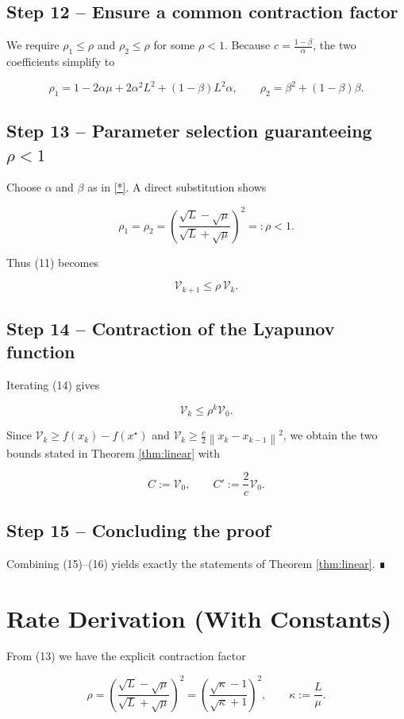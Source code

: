 \documentclass{article}
\newcommand{\norm}[1]{\left\|#1\right\|}
\begin{document}
\subsection*{Step 12 – Ensure a common contraction factor}
We require $\rho_{1}\le\rho$ and $\rho_{2}\le\rho$ for some $\rho<1$.  
Because $c=\frac{1-\beta}{\alpha}$, the two coefficients simplify to  

\[
\rho_{1}=1-2\alpha\mu + 2\alpha^{2}L^{2}+ (1-\beta)L^{2}\alpha,
\qquad
\rho_{2}= \beta^{2}+ (1-\beta)\beta.
\tag{12}
\]

\subsection*{Step 13 – Parameter selection guaranteeing $\rho<1$}
Choose $\alpha$ and $\beta$ as in \eqref{*}.  
A direct substitution shows

\[
\rho_{1}= \rho_{2}= \left(\frac{\sqrt{L}-\sqrt{\mu}}{\sqrt{L}+\sqrt{\mu}}\right)^{2}=:\rho<1.
\tag{13}
\]

Thus (11) becomes  

\[
\mathcal{V}_{k+1}\le\rho\,\mathcal{V}_{k}.
\tag{14}
\]

\subsection*{Step 14 – Contraction of the Lyapunov function}
Iterating (14) gives  

\[
\mathcal{V}_{k}\le\rho^{k}\mathcal{V}_{0}.
\tag{15}
\]

Since $\mathcal{V}_{k}\ge f(x_k)-f(x^\star)$ and $\mathcal{V}_{k}\ge \frac{c}{2}\norm{x_k-x_{k-1}}^{2}$, we obtain the two bounds stated in Theorem \ref{thm:linear} with  

\[
C:=\mathcal{V}_{0},\qquad C':=\frac{2}{c}\mathcal{V}_{0}.
\tag{16}
\]

\subsection*{Step 15 – Concluding the proof}
Combining (15)–(16) yields exactly the statements of Theorem \ref{thm:linear}.  ∎

\section*{Rate Derivation (With Constants)}
From (13) we have the explicit contraction factor  

\[
\rho = \left(\frac{\sqrt{L}-\sqrt{\mu}}{\sqrt{L}+\sqrt{\mu}}\right)^{2}
      = \left(\frac{\sqrt{\kappa}-1}{\sqrt{\kappa}+1}\right)^{2},
\qquad \kappa:=\frac{L}{\mu}.
\]
\end{document}
